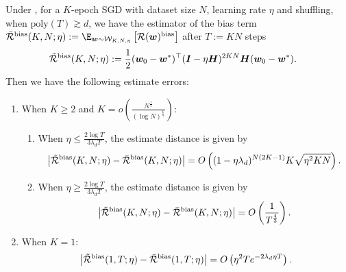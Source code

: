 \begin{lemma} \label{lem:bias-estimate}
Under , for a $K$-epoch SGD with dataset size $N$, learning rate $\eta$ and shuffling, when $\text{poly}(T)\gtrsim d$, we have the estimator of the bias term $\bar{\cR}^{\bias}(K,N;\eta):= \E_{\vw \sim \cW_{K,N,\eta}}\left[\cR(\vw)^{\bias}\right]$ after $T:=KN$ steps
\begin{align*}
    \Tilde{\mathcal{R}}^{\mathrm{bias}}(K,N;\eta)&:= \frac{1}{2}({\bm{w}}_0 - {\bm{w}}^*)^{\top} ({\bm{I}}-\eta{\bm{H}})^{2KN}{\bm{H}} ({\bm{w}}_0 - {\bm{w}}^*).
\end{align*}
Then we have the following estimate errors:
\begin{enumerate}[leftmargin=*]
    \item When $K\geq 2$ and $K = o\left(\frac{N^{\frac{1}{5}}}{\left(\log N\right)^{\frac{6}{5}}}\right)$:
    \begin{enumerate}[leftmargin=*]        
        \item When $\eta \leq \frac{2\log T}{3\lambda_d T}$, the estimate distance is given by
        \begin{gather*}
            \left|\Tilde{\mathcal{R}}^{\mathrm{bias}}(K,N;\eta) - \bar{\mathcal{R}}^{\mathrm{bias}}(K,N;\eta)\right| = O\left((1-\eta \lambda_d)^{N(2K-1)}K\sqrt{\eta^2KN}\right).
        \end{gather*} 
        \item When $\eta \geq \frac{2\log T}{3\lambda_d T}$, the estimate distance is given by
        \begin{gather*}
           \left|\Tilde{\mathcal{R}}^{\mathrm{bias}}(K,N;\eta) - \bar{\mathcal{R}}^{\mathrm{bias}}(K,N;\eta)\right| = O\left(\frac{1}{T^{\frac{4}{3}}}\right).
        \end{gather*}  
    \end{enumerate}
    \item When $K = 1$:
    \begin{gather*}
       \left|\Tilde{\mathcal{R}}^{\mathrm{bias}}(1,T;\eta) - \bar{\mathcal{R}}^{\mathrm{bias}}(1,T;\eta)\right| =  O\left(\eta^2 Te^{-2\lambda_d\eta T}\right).
    \end{gather*}

\end{enumerate}
\end{lemma}
